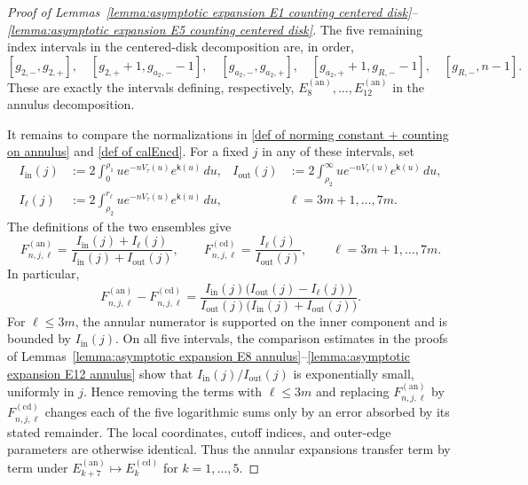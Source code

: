 \documentclass[a4paper]{article}
\numberwithin{equation}{section}
\begin{document}
\begin{proof}[Proof of Lemmas~\ref{lemma:asymptotic expansion E1 counting centered disk}--\ref{lemma:asymptotic expansion E5 counting centered disk}]
The five remaining index intervals in the centered-disk decomposition are, in order,
\[
 [g_{2,-},g_{2,+}],\quad
 [g_{2,+}+1,g_{a_2,-}-1],\quad
 [g_{a_2,-},g_{a_2,+}],\quad
 [g_{a_2,+}+1,g_{R,-}-1],\quad
 [g_{R,-},n-1].
\]
These are exactly the intervals defining, respectively,
$E_8^{(\mathrm{an})},\dots,E_{12}^{(\mathrm{an})}$ in the annulus
decomposition.

It remains to compare the normalizations in
\eqref{def of norming constant + counting on annulus} and
\eqref{def of calEncd}.  For a fixed $j$ in any of these intervals, set
\begin{align*}
I_{\mathrm{in}}(j)&:=2\int_0^{\rho_1}
u e^{-nV_\tau(u)}e^{\mathsf{k}(u)}\,du,&
I_{\mathrm{out}}(j)&:=2\int_{\rho_2}^{\infty}
u e^{-nV_\tau(u)}e^{\mathsf{k}(u)}\,du,\\
I_\ell(j)&:=2\int_{\rho_2}^{r_\ell}
u e^{-nV_\tau(u)}e^{\mathsf{k}(u)}\,du,
&&\ell=3m+1,\dots,7m.
\end{align*}
The definitions of the two ensembles give
\[
F_{n,j,\ell}^{(\mathrm{an})}
=\frac{I_{\mathrm{in}}(j)+I_\ell(j)}
       {I_{\mathrm{in}}(j)+I_{\mathrm{out}}(j)},
\qquad
F_{n,j,\ell}^{(\mathrm{cd})}
=\frac{I_\ell(j)}{I_{\mathrm{out}}(j)},
\qquad \ell=3m+1,\dots,7m.
\]
In particular,
\[
F_{n,j,\ell}^{(\mathrm{an})}-F_{n,j,\ell}^{(\mathrm{cd})}
=\frac{I_{\mathrm{in}}(j)
       \bigl(I_{\mathrm{out}}(j)-I_\ell(j)\bigr)}
       {I_{\mathrm{out}}(j)
       \bigl(I_{\mathrm{in}}(j)+I_{\mathrm{out}}(j)\bigr)}.
\]
For $\ell\leq3m$, the annular numerator is supported on the inner component
and is bounded by $I_{\mathrm{in}}(j)$.  On all five intervals, the comparison
estimates in the proofs of
Lemmas~\ref{lemma:asymptotic expansion E8 annulus}--\ref{lemma:asymptotic expansion E12 annulus}
show that $I_{\mathrm{in}}(j)/I_{\mathrm{out}}(j)$ is exponentially small,
uniformly in $j$.  Hence removing the terms with $\ell\leq3m$ and replacing
$F_{n,j,\ell}^{(\mathrm{an})}$ by $F_{n,j,\ell}^{(\mathrm{cd})}$ changes each
of the five logarithmic sums only by an error absorbed by its stated
remainder.  The local coordinates, cutoff indices, and outer-edge parameters
are otherwise identical.  Thus the annular expansions transfer term by term
under $E_{k+7}^{(\mathrm{an})}\mapsto E_k^{(\mathrm{cd})}$ for
$k=1,\dots,5$.
\end{proof}
\end{document}
